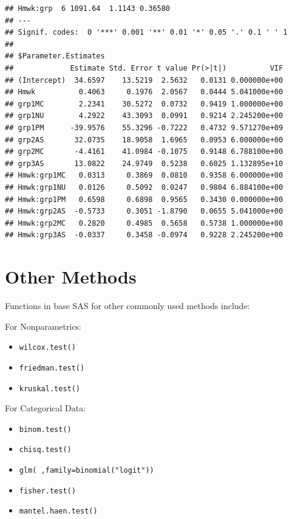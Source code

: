\documentclass[
]{book}
\providecommand{\tightlist}{%
  \setlength{\itemsep}{0pt}\setlength{\parskip}{0pt}}
\begin{document}
\begin{verbatim}
## Hmwk:grp  6 1091.64  1.1143 0.36580  
## ---
## Signif. codes:  0 '***' 0.001 '**' 0.01 '*' 0.05 '.' 0.1 ' ' 1
## 
## $Parameter.Estimates
##             Estimate Std. Error t value Pr(>|t|)          VIF
## (Intercept)  34.6597    13.5219  2.5632   0.0131 0.000000e+00
## Hmwk          0.4063     0.1976  2.0567   0.0444 5.041000e+00
## grp1MC        2.2341    30.5272  0.0732   0.9419 1.000000e+00
## grp1NU        4.2922    43.3093  0.0991   0.9214 2.245200e+00
## grp1PM      -39.9576    55.3296 -0.7222   0.4732 9.571270e+09
## grp2AS       32.0735    18.9058  1.6965   0.0953 6.000000e+00
## grp2MC       -4.4161    41.0984 -0.1075   0.9148 6.788100e+00
## grp3AS       13.0822    24.9749  0.5238   0.6025 1.132895e+10
## Hmwk:grp1MC   0.0313     0.3869  0.0810   0.9358 6.000000e+00
## Hmwk:grp1NU   0.0126     0.5092  0.0247   0.9804 6.884100e+00
## Hmwk:grp1PM   0.6598     0.6898  0.9565   0.3430 0.000000e+00
## Hmwk:grp2AS  -0.5733     0.3051 -1.8790   0.0655 5.041000e+00
## Hmwk:grp2MC   0.2820     0.4985  0.5658   0.5738 1.000000e+00
## Hmwk:grp3AS  -0.0337     0.3458 -0.0974   0.9228 2.245200e+00
\end{verbatim}

\hypertarget{other-methods}{%
\section{Other Methods}\label{other-methods}}

Functions in base SAS for other commonly used methods include:

For Nonparametrics:

\begin{itemize}
\tightlist
\item
  \texttt{wilcox.test()}
\item
  \texttt{friedman.test()}
\item
  \texttt{kruskal.test()}
\end{itemize}

For Categorical Data:

\begin{itemize}
\tightlist
\item
  \texttt{binom.test()}
\item
  \texttt{chisq.test()}
\item
  \texttt{glm(\ ,family=binomial("logit"))}
\item
  \texttt{fisher.test()}
\item
  \texttt{mantel.haen.test()}
\end{itemize}
\end{document}
